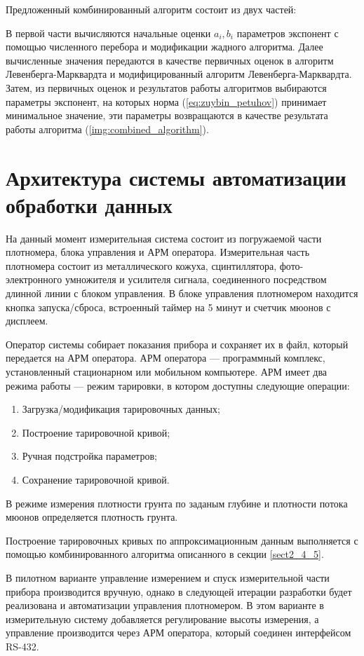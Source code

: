 Предложенный комбинированный алгоритм состоит из двух частей: 

В первой части вычисляются начальные оценки $a_i, b_i$ параметров экспонент с помощью численного перебора и модификации жадного алгоритма. 
Далее вычисленные значения передаются в качестве первичных оценок в алгоритм Левенберга-Марквардта
 и модифицированный алгоритм Левенберга-Марквардта. Затем, из первичных оценок и результатов работы алгоритмов
 выбираются параметры экспонент, на которых норма (\ref{eq:zuybin_petuhov}) принимает минимальное значение,
 эти параметры возвращаются в качестве результата работы алгоритма  (\ref{img:combined_algorithm}).


\section{Архитектура системы автоматизации обработки данных}\label{subsect2_5}

На данный момент измерительная система состоит из погружаемой части плотномера, блока управления и АРМ оператора. Измерительная часть плотномера состоит из металлического кожуха, сцинтиллятора, фото-электронного умножителя и усилителя сигнала, соединенного посредством длинной линии с блоком управления. В блоке управления плотномером находится кнопка запуска/сброса, встроенный таймер на 5 минут и счетчик мюонов с дисплеем.

Оператор системы собирает показания прибора и сохраняет их в файл, который передается на АРМ оператора. АРМ оператора --- программный комплекс, установленный стационарном или мобильном компьютере. АРМ имеет два режима работы --- режим тарировки, в котором доступны следующие операции:

\begin{enumerate}
	\item Загрузка/модификация тарировочных данных;
	\item Построение тарировочной кривой;
	\item Ручная подстройка параметров;
	\item Сохранение тарировочной кривой.
\end{enumerate}

В режиме измерения плотности грунта по заданым глубине и плотности потока мюонов определяется плотность грунта.

Построение тарировочных кривых по аппроксимационным данным выполняется с помощью комбинированного алгоритма описанного в секции \ref{sect2_4_5}.

В пилотном варианте управление измерением и спуск измерительной части прибора производится вручную, однако в следующей итерации разработки будет реализована и автоматизации управления плотномером. В этом варианте в измерительную систему добавляется регулирование высоты измерения, а управление производится через АРМ оператора, который соединен интерфейсом RS-432.

